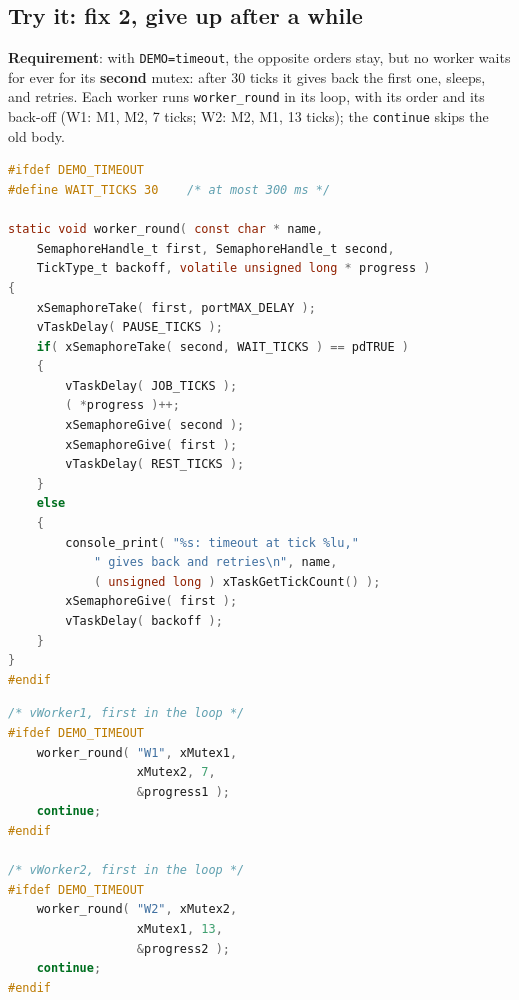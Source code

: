\subsection{Try it: fix 2, give up after a while}
\textbf{Requirement}: with \texttt{DEMO=timeout}, the opposite orders stay, but no worker waits for ever for its \textbf{second} mutex: after 30 ticks it gives back the first one, sleeps, and retries. Each worker runs \texttt{worker\_round} in its loop, with its order and its back-off (W1: M1, M2, 7 ticks; W2: M2, M1, 13 ticks); the \texttt{continue} skips the old body.
\par\noindent\begin{minipage}[t]{0.6\textwidth}
\begin{lstlisting}[language=C, showstringspaces=false, basicstyle=\ttfamily\scriptsize]
#ifdef DEMO_TIMEOUT
#define WAIT_TICKS 30    /* at most 300 ms */

static void worker_round( const char * name,
    SemaphoreHandle_t first, SemaphoreHandle_t second,
    TickType_t backoff, volatile unsigned long * progress )
{
    xSemaphoreTake( first, portMAX_DELAY );
    vTaskDelay( PAUSE_TICKS );
    if( xSemaphoreTake( second, WAIT_TICKS ) == pdTRUE )
    {
        vTaskDelay( JOB_TICKS );
        ( *progress )++;
        xSemaphoreGive( second );
        xSemaphoreGive( first );
        vTaskDelay( REST_TICKS );
    }
    else
    {
        console_print( "%s: timeout at tick %lu,"
            " gives back and retries\n", name,
            ( unsigned long ) xTaskGetTickCount() );
        xSemaphoreGive( first );
        vTaskDelay( backoff );
    }
}
#endif
\end{lstlisting}
\end{minipage}\hfill
\begin{minipage}[t]{0.37\textwidth}
\begin{lstlisting}[language=C, showstringspaces=false, basicstyle=\ttfamily\scriptsize]
/* vWorker1, first in the loop */
#ifdef DEMO_TIMEOUT
    worker_round( "W1", xMutex1,
                  xMutex2, 7,
                  &progress1 );
    continue;
#endif

/* vWorker2, first in the loop */
#ifdef DEMO_TIMEOUT
    worker_round( "W2", xMutex2,
                  xMutex1, 13,
                  &progress2 );
    continue;
#endif
\end{lstlisting}
\end{minipage}

